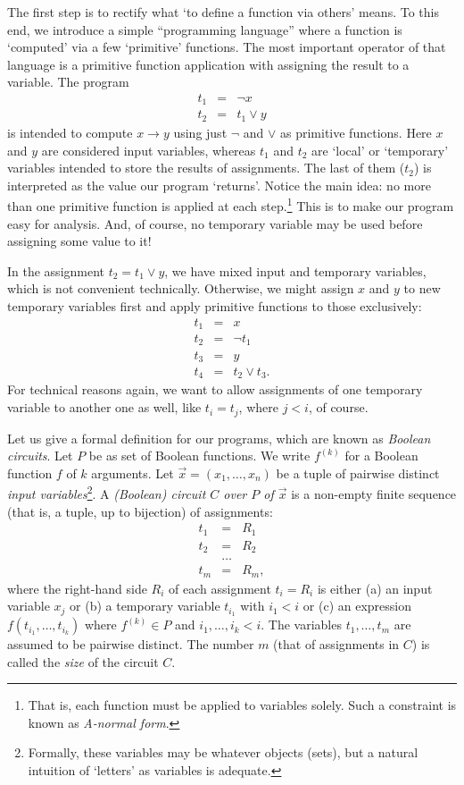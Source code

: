 \documentclass[12pt,notitlepage]{article}
\theoremstyle{plain}
\theoremstyle{definition}
\theoremstyle{plain}
\newcommand{\1}{\mathbf{1}}
\newcommand{\0}{\mathbf{0}}
\begin{document}
The first step is to rectify what `to define a function via others' means. To this end, we introduce a simple ``programming language'' where a function is `computed' via a few `primitive' functions. The most important operator of that language is a primitive function application with assigning the result to a variable. The program 
$$
\begin{array}{rcl}
	t_1 &=& \neg x\\
	t_2 &=& t_1 \vee y
\end{array}
$$
is intended to compute $x \to y$ using just $\neg$ and $\vee$ as primitive functions. Here $x$ and $y$ are considered input variables, whereas $t_1$ and $t_2$ are `local' or `temporary' variables intended to store the results of assignments. The last of them ($t_2$) is interpreted as the value our program `returns'. Notice the main idea: no more than one primitive function is applied at each step.\footnote{That is, each function must be applied to variables solely. Such a constraint is known as \emph{A-normal form}.} This is to make our program easy for analysis. And, of course, no temporary variable may be used before assigning some value to it!

In the assignment $t_2 = t_1 \vee y$, we have mixed input and temporary variables, which is not convenient technically. Otherwise, we might assign $x$ and $y$ to new temporary variables first and apply primitive functions to those exclusively:
$$
\begin{array}{rcl}
	t_1 &=& x\\
	t_2 &=& \neg t_1\\
	t_3 &=& y\\
	t_4 &=& t_2 \vee t_3.
\end{array}
$$
For technical reasons again, we want to allow assignments of one temporary variable to another one as well, like $t_i = t_j$, where $j < i$, of course.

Let us give a formal definition for our programs, which are known as \emph{Boolean circuits}. Let $P$ be as set of Boolean functions. We write $f^{(k)}$ for a Boolean function $f$ of $k$ arguments. Let $\vec x = (x_1, \ldots, x_n)$ be a tuple of pairwise distinct \emph{input variables}\footnote{Formally, these variables may be whatever objects (sets), but a natural intuition of `letters' as variables is adequate.}. A \emph{(Boolean) circuit $C$ over $P$ of $\vec x$} is a non-empty finite sequence (that is, a tuple, up to bijection) of assignments:
$$
\begin{array}{rcl}
	t_1 &=& R_1\\
	t_2 &=& R_2\\
	&\ldots&\\
	t_m &=& R_m,
\end{array}
$$
where the right-hand side $R_i$ of each assignment $t_i = R_i$ is either (a) an input variable $x_j$ or (b) a temporary variable $t_{i_1}$ with $i_1 < i$ or (c) an expression $f(t_{i_1},\ldots, t_{i_k})$ where $f^{(k)} \in P$ and $i_1,\ldots, i_k < i$. The variables $t_1,\ldots,t_m$ are assumed to be pairwise distinct. The number $m$ (that of assignments in $C$) is called the \emph{size} of the circuit $C$.
\end{document}

